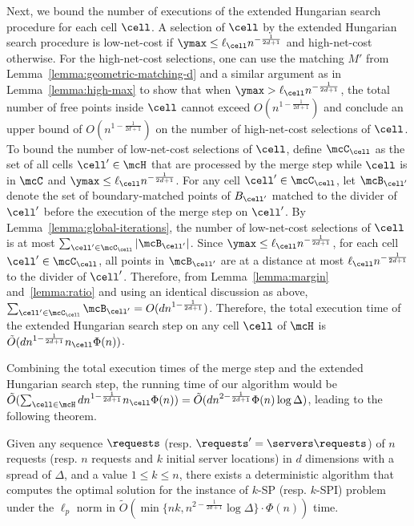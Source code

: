 Next, we bound the number of executions of the extended Hungarian search procedure for each cell $\cell$.
A selection of $\cell$ by the extended Hungarian search procedure is low-net-cost if $\ymax\le \ell_\cell n^{-\frac{1}{2d+1}}$ and high-net-cost otherwise. For the high-net-cost selections, one can use the matching $M'$ from Lemma~\ref{lemma:geometric-matching-d} and a similar argument as in Lemma~\ref{lemma:high-max} to show that when $\ymax> \ell_\cell n^{-\frac{1}{2d+1}}$, the total number of free points inside $\cell$ cannot exceed $O(n^{1-\frac{1}{2d+1}})$ and conclude an upper bound of $O(n^{1-\frac{1}{2d+1}})$ on the number of high-net-cost selections of $\cell$. 
%
%
%
To bound the number of low-net-cost selections of $\cell$, define $\mcC_\cell$ as the set of all cells $\cell'\in\mcH$ that are processed by the merge step while $\cell$ is in $\mcC$ and $\ymax\le \ell_\cell n^{-\frac{1}{2d+1}}$. For any cell $\cell'\in\mcC_\cell$, let $\mcB_{\cell'}$ denote the set of boundary-matched points of $B_{\cell'}$ matched to the divider of $\cell'$ before the execution of the merge step on $\cell'$. By Lemma~\ref{lemma:global-iterations}, the number of low-net-cost selections of $\cell$ is at most $\sum_{\cell'\in\mcC_\cell}|\mcB_{\cell'}|$. Since $\ymax\le \ell_\cell n^{-\frac{1}{2d+1}}$, for each cell $\cell'\in\mcC_\cell$, all points in $\mcB_{\cell'}$ are at a distance at most $\ell_\cell n^{-\frac{1}{2d+1}}$ to the divider of $\cell'$. Therefore, from Lemma~\ref{lemma:margin} and~\ref{lemma:ratio} and using an identical discussion as above, $\sum_{\cell'\in\mcC_\cell}\mcB_{\cell'} = O(dn^{1-\frac{1}{2d+1}})$. Therefore, the total execution time of the extended Hungarian search step on any cell $\cell$ of $\mcH$ is $\tilde{O}(dn^{1-\frac{1}{2d+1}}n_\cell\Phi(n))$. 

Combining the total execution times of the merge step and the extended Hungarian search step, the running time of our algorithm would be $\tilde{O}(\sum_{\cell\in\mcH}dn^{1-\frac{1}{2d+1}}n_\cell\Phi(n)) = \tilde{O}(dn^{2-\frac{1}{2d+1}}\Phi(n)\log\Delta)$, leading to the following theorem.

\begin{theorem}\label{thm:kSP-d}
Given any sequence $\requests$ (resp. $\requests'=\servers\requests$) of $n$ requests (resp. $n$ requests and $k$ initial server locations) in $d$ dimensions with a spread of $\Delta$, and a value $1 \le k \le n$, there exists a deterministic algorithm that computes the optimal solution for the instance of $k$-SP (resp. $k$-SPI) problem under the $\ell_p$ norm in $\tilde{O}(\min\{nk, n^{2-\frac{1}{2d+1}}\log \Delta\}\cdot\Phi(n))$ time.
\end{theorem}

